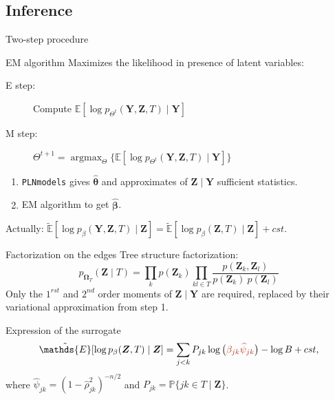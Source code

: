 \documentclass[11pt]{beamer}
\newcommand{\Esp}{{\mathds{E}}}
\newcommand\betab{{\boldsymbol{\beta}}}
\newcommand\thetab{{\boldsymbol{\theta}}}
\newcommand\Omegab{{\boldsymbol{\Omega}}}
\newcommand{\Ybf}{{\boldsymbol{Y}}}
\newcommand{\Zbf}{{\boldsymbol{Z}}}
\newcommand{\emphase}[1]{\textcolor{Complement}{#1}}
\newcommand{\argmax}{\mathop{\mathrm{argmax}}}
\begin{document}
 \subsection{Inference}
  \begin{frame}{Two-step procedure}
    \begin{block}{EM algorithm \citep{DLR77}}
 Maximizes the likelihood in presence of latent variables: \vspace{0.2cm}
 
  \begin{description}
  \item[E step:] \vspace{-0.2cm} Compute $\Esp[\log p_{\Theta^t}(\Ybf,\Zbf,T)\mid\Ybf]$
  \item[M step:] $\Theta^{t+1}=\argmax_{\Theta}\big\{\Esp[\log p_{\Theta^t}(\Ybf, \Zbf,T)\mid\Ybf]\big\}$
  \end{description}
    \end{block}
    \pause
   \begin{enumerate}
   \item \texttt{PLNmodels} \citep{CMR18} gives $\widehat{\thetab}$ and approximates of $\Zbf \mid \Ybf$ sufficient statistics.
   \item EM algorithm to get  $\widehat{\betab}$.
   \end{enumerate}
   \bigskip
   
 
    Actually: $\tilde{\Esp}[\log p_\beta (\Ybf,\Zbf, T)\mid \Zbf]=\tilde{\Esp}[\log p_\beta (\Zbf, T)\mid \Zbf]+cst$.
  \end{frame}
\begin{frame}{Factorization on the edges}
\emphase{Tree structure factorization}:
$$p_{\Omegab_T}(\Zbf\mid T) = \prod_k p(\Zbf_k) \prod_{kl\in T} \frac{p(\Zbf_k,\Zbf_l)}{p(\Zbf_k)\: p(\Zbf_l)}$$
 Only the $1^{rst}$ and $2^{nd}$ order moments of $\Zbf\mid\Ybf$ are required, replaced by their variational approximation from  step 1.
 \begin{block}{Expression of  the surrogate}
 $$\tilde{\Esp}[\log p_\beta (\Zbf, T)\mid \Zbf] = \sum_{j<k} P_{jk} \log \big(\emphase{\beta_{jk}\widehat{\psi}_{jk} }\big)- \log B + cst,$$
 where $\widehat{\psi}_{jk} = (1-\widehat{\rho}_{jk}^2)^{-n/2}$ and $P_{jk}=\mathds{P}\{jk\in T \mid \Zbf\}$.
 \end{block}
 
\end{frame}
\end{document}
